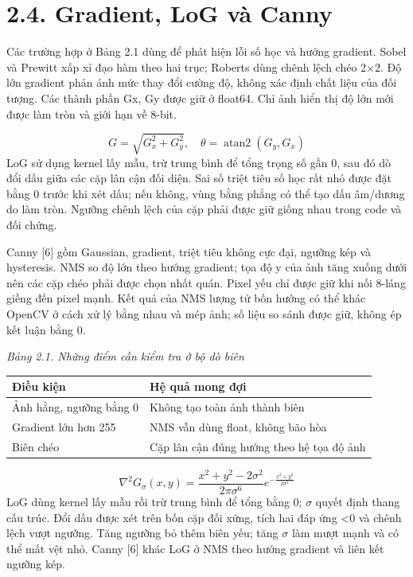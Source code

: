 \documentclass[12pt,a4paper]{extreport}
\begin{document}
\section*{2.4. Gradient,\allowbreak{} LoG và Canny}
Các trường hợp ở Bảng 2.1 dùng để phát hiện lỗi số học và hướng gradient. Sobel và Prewitt xấp xỉ đạo hàm theo hai trục; Roberts dùng chênh lệch chéo 2\ensuremath{\times}2. Độ lớn gradient phản ánh mức thay đổi cường độ,\allowbreak{} không xác định chất liệu của đối tượng. Các thành phần Gx,\allowbreak{} Gy được giữ ở float64. Chỉ ảnh hiển thị độ lớn mới được làm tròn và giới hạn về 8-bit.
\par
\begin{equation}G=\sqrt{G_x^2+G_y^2},\quad \theta=\operatorname{atan2}(G_y,G_x)\tag{2.10}\end{equation}
LoG sử dụng kernel lấy mẫu,\allowbreak{} trừ trung bình để tổng trọng số gần 0,\allowbreak{} sau đó dò đổi dấu giữa các cặp lân cận đối diện. Sai số triệt tiêu số học rất nhỏ được đặt bằng 0 trước khi xét dấu; nếu không,\allowbreak{} vùng bằng phẳng có thể tạo dấu âm/\allowbreak{}dương do làm tròn. Ngưỡng chênh lệch của cặp phải được giữ giống nhau trong code và đối chứng.
\par
Canny [6] gồm Gaussian,\allowbreak{} gradient,\allowbreak{} triệt tiêu không cực đại,\allowbreak{} ngưỡng kép và hysteresis. NMS so độ lớn theo hướng gradient; tọa độ y của ảnh tăng xuống dưới nên các cặp chéo phải được chọn nhất quán. Pixel yếu chỉ được giữ khi nối 8-láng giềng đến pixel mạnh. Kết quả của NMS lượng tử bốn hướng có thể khác OpenCV ở cách xử lý bằng nhau và mép ảnh; số liệu so sánh được giữ,\allowbreak{} không ép kết luận bằng 0.
\par
{\fontsize{10.5}{12}\selectfont\textit{Bảng 2.1. Những điểm cần kiểm tra ở bộ dò biên}
\begin{longtable}{>{\raggedright\arraybackslash}p{7.693cm}|>{\raggedright\arraybackslash}p{7.693cm}}
\textbf{Điều kiện} & \textbf{Hệ quả mong đợi}\\\hline
\endhead
Ảnh hằng,\allowbreak{} ngưỡng bằng 0 & Không tạo toàn ảnh thành biên\\\hline
Gradient lớn hơn 255 & NMS vẫn dùng float,\allowbreak{} không bão hòa\\\hline
Biên chéo & Cặp lân cận đúng hướng theo hệ tọa độ ảnh\\\hline
\end{longtable}}
\begin{equation}\nabla^2G_\sigma(x,y)=\frac{x^2+y^2-2\sigma^2}{2\pi\sigma^6}e^{-\frac{x^2+y^2}{2\sigma^2}}\tag{2.11}\end{equation}
LoG dùng kernel lấy mẫu rồi trừ trung bình để tổng bằng 0; \ensuremath{\sigma} quyết định thang cấu trúc. Đổi dấu được xét trên bốn cặp đối xứng,\allowbreak{} tích hai đáp ứng <0 và chênh lệch vượt ngưỡng. Tăng ngưỡng bỏ thêm biên yếu; tăng \ensuremath{\sigma} làm mượt mạnh và có thể mất vệt nhỏ. Canny [6] khác LoG ở NMS theo hướng gradient và liên kết ngưỡng kép.
\par
\end{document}
